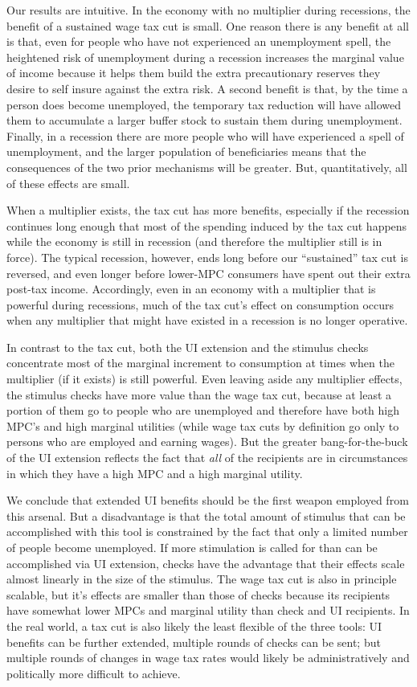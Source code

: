\documentclass[../HAFiscal]{subfiles}
\begin{document}
Our results are intuitive. In the economy with no multiplier during recessions, the benefit of a sustained wage tax cut is small.  One reason there is any benefit at all is that, even for people who have not experienced an unemployment spell, the heightened risk of unemployment during a recession increases the marginal value of income because it helps them build the extra precautionary reserves they desire to self insure against the extra risk.  A second benefit is that, by the time a person does become unemployed, the temporary tax reduction will have allowed them to accumulate a larger buffer stock to sustain them during unemployment.  Finally, in a recession there are more people who will have experienced a spell of unemployment, and the larger population of beneficiaries means that the consequences of the two prior mechanisms will be greater.  But, quantitatively, all of these effects are small.

When a multiplier exists, the tax cut has more benefits, especially if the recession continues long enough that most of the spending induced by the tax cut happens while the economy is still in recession (and therefore the multiplier still is in force).  The typical recession, however, ends long before our ``sustained'' tax cut is reversed, and even longer before lower-MPC consumers have spent out their extra post-tax income. Accordingly, even in an economy with a multiplier that is powerful during recessions, much of the tax cut's effect on consumption occurs when any multiplier that might have existed in a recession is no longer operative.

In contrast to the tax cut, both the UI extension and the stimulus checks concentrate most of the marginal increment to consumption at times when the multiplier (if it exists) is still powerful.  Even leaving aside any multiplier effects, the stimulus checks have more value than the wage tax cut, because at least a portion of them go to people who are unemployed and therefore have both high MPC's and high marginal utilities (while wage tax cuts by definition go only to persons who are employed and earning wages).  But the greater bang-for-the-buck of the UI extension reflects the fact that \textit{all} of the recipients are in circumstances in which they have a high MPC and a high marginal utility.

We conclude that extended UI benefits should be the first weapon employed from this arsenal.  But a disadvantage is that the total amount of stimulus that can be accomplished with this tool is constrained by the fact that only a limited number of people become unemployed.  If more stimulation is called for than can be accomplished via UI extension, checks have the advantage that their effects scale almost linearly in the size of the stimulus.  The wage tax cut is also in principle scalable, but it's effects are smaller than those of checks because its recipients have somewhat lower MPCs and marginal utility than check and UI recipients.  In the real world, a tax cut is also likely the least flexible of the three tools:  UI benefits can be further extended, multiple rounds of checks can be sent; but multiple rounds of changes in wage tax rates would likely be administratively and politically more difficult to achieve.
\end{document}
